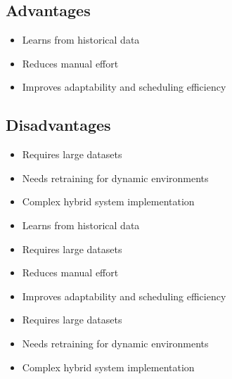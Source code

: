 \documentclass[a4paper, 12pt]{report}
\begin{document}
\subsection{Advantages}
\begin{itemize}
    \item Learns from historical data
    \item Reduces manual effort
    \item Improves adaptability and scheduling efficiency
\end{itemize}

\subsection{Disadvantages}
\begin{itemize}
    \item Requires large datasets
    \item Needs retraining for dynamic environments
    \item Complex hybrid system implementation
\end{itemize}




\begin{itemize}
    \item Learns from historical data
    \item Requires large datasets
    \item Reduces manual effort
    \item Improves adaptability and scheduling efficiency
\end{itemize}


\begin{itemize}
    \item Requires large datasets
    \item Needs retraining for dynamic environments
    \item Complex hybrid system implementation
\end{itemize}
\end{document}
